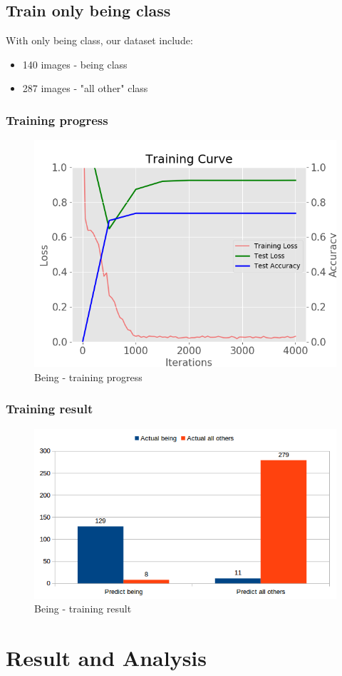\documentclass[11pt]{article}
\begin{document}
\subsection{Train only being class}
With only being class, our dataset include: 
\begin{itemize}
\item 140 images - being class
\item 287 images - "all other" class
\end{itemize}

\subsubsection{Training progress}

\begin{figure}[H]
\centering
\includegraphics[width=1\textwidth]{images/train_omit_other_only_being}
\caption{Being - training progress}
\end{figure}

\subsubsection{Training result}

\begin{figure}[H]
\centering
\includegraphics[width=1\textwidth]{images/omit_other_only_being}
\caption{Being - training result}
\end{figure}

\section{Result and Analysis}



\end{document}
